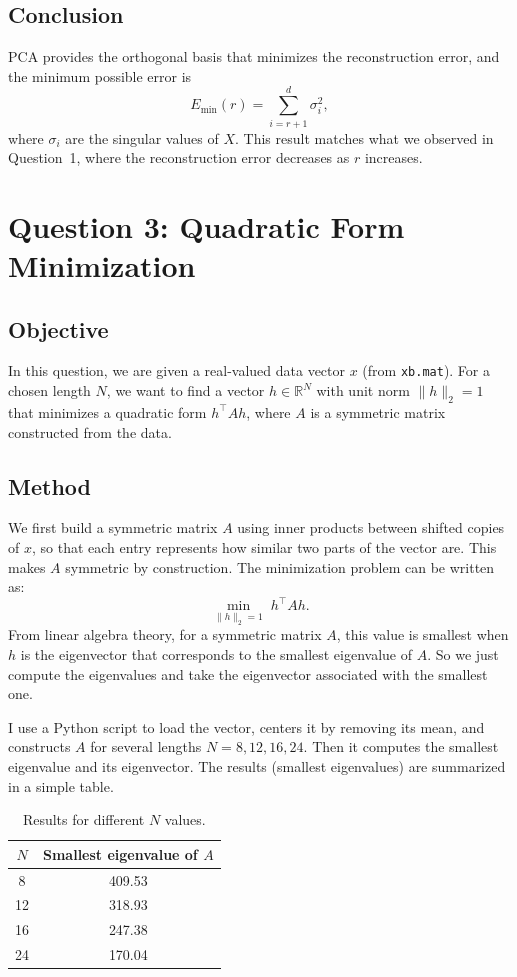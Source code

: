 \documentclass[12pt,a4paper]{article}
\begin{document}
\subsection{Conclusion}
PCA provides the orthogonal basis that minimizes the reconstruction error,
and the minimum possible error is
\[
E_{\min}(r) = \sum_{i=r+1}^{d} \sigma_i^2,
\]
where $\sigma_i$ are the singular values of $X$.
This result matches what we observed in Question~1, where the reconstruction error decreases as $r$ increases.

\newpage
\section{Question 3: Quadratic Form Minimization}

\subsection{Objective}
In this question, we are given a real-valued data vector $x$ (from \texttt{xb.mat}).  
For a chosen length $N$, we want to find a vector $h \in \mathbb{R}^N$ with unit norm $\|h\|_2 = 1$ that minimizes a quadratic form $h^\top A h$,  
where $A$ is a symmetric matrix constructed from the data.

\subsection{Method}
We first build a symmetric matrix $A$ using inner products between shifted copies of $x$, so that each entry represents how similar two parts of the vector are.  
This makes $A$ symmetric by construction.  
The minimization problem can be written as:
\[
\min_{\|h\|_2 = 1} \; h^\top A h.
\]
From linear algebra theory, for a symmetric matrix $A$, this value is smallest when $h$ is the eigenvector that corresponds to the smallest eigenvalue of $A$.  
So we just compute the eigenvalues and take the eigenvector associated with the smallest one.


I use a Python script to load the vector, centers it by removing its mean, and constructs $A$ for several lengths $N = 8, 12, 16, 24$.  
Then it computes the smallest eigenvalue and its eigenvector.  
The results (smallest eigenvalues) are summarized in a simple table.

\begin{table}[H]
\centering
\caption{Results for different $N$ values.}
\label{tab:q3_results}
\begin{tabular}{@{}cc@{}}
\toprule
$N$ & Smallest eigenvalue of $A$ \\
\midrule
8  & 409.53 \\
12 & 318.93 \\
16 & 247.38 \\
24 & 170.04 \\
\bottomrule
\end{tabular}
\end{table}
\end{document}
